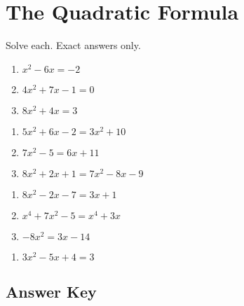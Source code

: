 \chapter{The Quadratic Formula}

Solve each. Exact answers only.

\begin{multicols}{3}
\begin{enumerate}
	\item $x^2-6x=-2$
	\item $4x^2 + 7x - 1 = 0$
    \item $8x^2 + 4x = 3$
\end{enumerate}	\setcounter{Review}{\value{enumi}}
\end{multicols}
\begin{multicols}{3}
\begin{enumerate}		\setcounter{enumi}{\value{Review}}
    \item $5x^2 + 6x - 2 = 3x^2 + 10$
    \item $7x^2-5 = 6x+11$
    \item $8x^2+2x+1=7x^2-8x-9$
\end{enumerate}	\setcounter{Review}{\value{enumi}}
\end{multicols}
\begin{multicols}{3}
\begin{enumerate}		\setcounter{enumi}{\value{Review}}
    \item $8x^2 - 2x - 7 = 3x + 1$
    \item $x^4+7x^2-5=x^4+3x$
    \item $-8x^2=3x-14$
\end{enumerate}	\setcounter{Review}{\value{enumi}}
\end{multicols}
\begin{multicols}{3}
\begin{enumerate}		\setcounter{enumi}{\value{Review}}
    \item $3x^2 - 5x + 4 = 3$
\end{enumerate}	\setcounter{Review}{\value{enumi}}
\end{multicols}




\newpage

\section{Answer Key}

